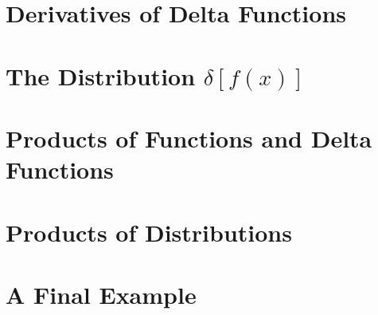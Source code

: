 \section{Derivatives of Delta Functions}

\section{The Distribution $\delta[f(x)]$}

\section{Products of Functions and Delta Functions}

\section{Products of Distributions}

\section{A Final Example}


